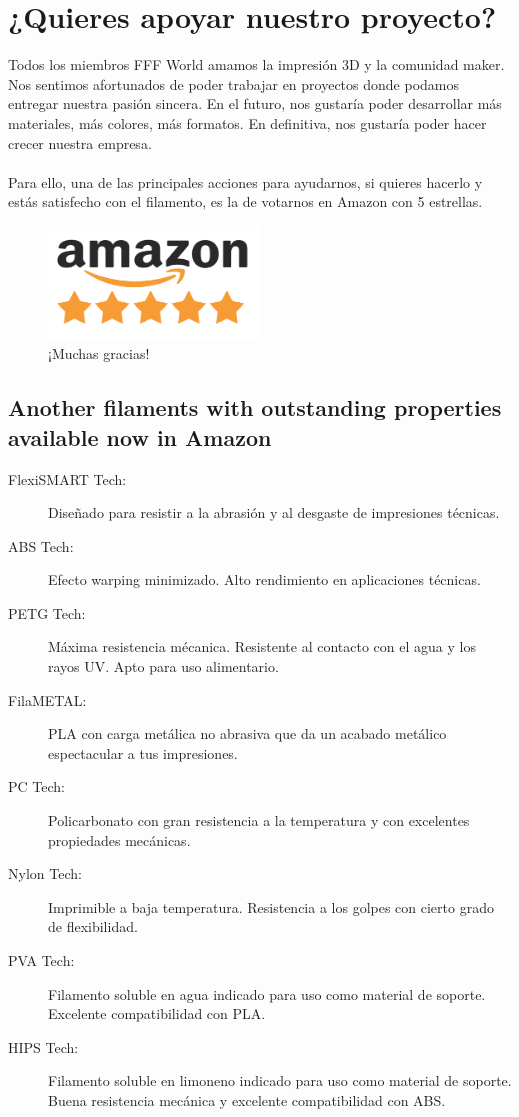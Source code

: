 \section{¿Quieres apoyar nuestro proyecto?}
Todos los miembros FFF World amamos la impresión 3D y la comunidad maker. Nos sentimos afortunados de poder trabajar en proyectos donde podamos entregar nuestra pasión sincera. En el futuro, nos gustaría poder desarrollar más materiales, más colores, más formatos. En definitiva, nos gustaría poder hacer crecer nuestra empresa.\\\\
Para ello, una de las principales acciones para ayudarnos, si quieres hacerlo y estás satisfecho con el filamento, es la de votarnos en Amazon con 5 estrellas.\begin{figure}[H]
\centering
\includegraphics[width=0.5\textwidth,cfbox=azul_marcos 1pt 0pt]{FOTOS/AMAZON_FIVE_STARS}
\caption*{¡Muchas gracias!}
\end{figure}
\subsection{Another filaments with outstanding properties available now in Amazon}
\begin{description}
\item[FlexiSMART Tech:] Diseñado para resistir a la abrasión y al desgaste de impresiones técnicas. 
\item[ABS Tech:] Efecto warping minimizado. Alto rendimiento en aplicaciones técnicas. 
\item[PETG Tech:] Máxima resistencia mécanica. Resistente al contacto con el agua y los rayos UV. Apto para uso alimentario. 
\item[FilaMETAL:] PLA con carga metálica no abrasiva que da un acabado metálico espectacular a tus impresiones. 
\item[PC Tech:] Policarbonato con gran resistencia a la temperatura y con excelentes propiedades mecánicas. 
\item[Nylon Tech:] Imprimible a baja temperatura. Resistencia a los golpes con cierto grado de flexibilidad. 
\item[PVA Tech:] Filamento soluble en agua indicado para uso como material de soporte. Excelente compatibilidad con PLA. 
\item[HIPS Tech:] Filamento soluble en limoneno indicado para uso como material de soporte. Buena resistencia mecánica y excelente compatibilidad con ABS. 
\end{description}
